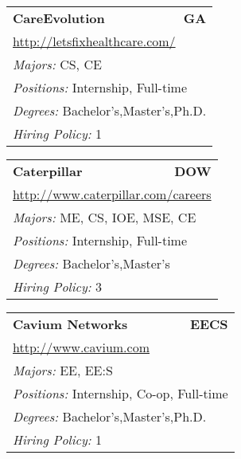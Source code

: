 \documentclass[twoside]{article}
\begin{document}
\begin{center}
\begin{multicols}{3}
\begin{FlushLeft}
\begin{minipage}{.9\columnwidth}
\end{minipage}
 
\begin{minipage}{.9\columnwidth}\begin{tabularx}{.95\columnwidth}{Xr}
                 {\Large\bf CareEvolution} & {\Large\bf GA}\\
    \multicolumn{2}{p{.95\columnwidth}}{\url{http://letsfixhealthcare.com/}}\\
    \multicolumn{2}{p{.95\columnwidth}}{\emph{Majors:} CS, CE}\\
    \multicolumn{2}{p{.95\columnwidth}}{\emph{Positions:} Internship, Full-time}\\
    \multicolumn{2}{p{.95\columnwidth}}{\emph{Degrees:} Bachelor's,Master's,Ph.D.}\\
    \multicolumn{2}{p{.95\columnwidth}}{\emph{Hiring Policy:} 1}\\
    \end{tabularx}
    
\end{minipage}
 
\begin{minipage}{.9\columnwidth}\begin{tabularx}{.95\columnwidth}{Xr}
                 {\Large\bf Caterpillar} & {\Large\bf DOW}\\
    \multicolumn{2}{p{.95\columnwidth}}{\url{http://www.caterpillar.com/careers}}\\
    \multicolumn{2}{p{.95\columnwidth}}{\emph{Majors:} ME, CS, IOE, MSE, CE}\\
    \multicolumn{2}{p{.95\columnwidth}}{\emph{Positions:} Internship, Full-time}\\
    \multicolumn{2}{p{.95\columnwidth}}{\emph{Degrees:} Bachelor's,Master's}\\
    \multicolumn{2}{p{.95\columnwidth}}{\emph{Hiring Policy:} 3}\\
    \end{tabularx}
    
\end{minipage}
 
\begin{minipage}{.9\columnwidth}\begin{tabularx}{.95\columnwidth}{Xr}
                 {\Large\bf Cavium Networks} & {\Large\bf EECS}\\
    \multicolumn{2}{p{.95\columnwidth}}{\url{http://www.cavium.com}}\\
    \multicolumn{2}{p{.95\columnwidth}}{\emph{Majors:} EE, EE:S}\\
    \multicolumn{2}{p{.95\columnwidth}}{\emph{Positions:} Internship, Co-op, Full-time}\\
    \multicolumn{2}{p{.95\columnwidth}}{\emph{Degrees:} Bachelor's,Master's,Ph.D.}\\
    \multicolumn{2}{p{.95\columnwidth}}{\emph{Hiring Policy:} 1}\\
    \end{tabularx}
    

\end{minipage}
\end{FlushLeft}
\end{multicols}
\end{center}
\end{document}
